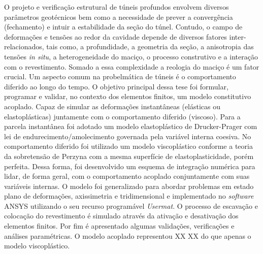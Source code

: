 O projeto e verificação estrutural de túneis profundos envolvem diversos parâmetros geotécnicos bem como a necessidade de prever a convergência (fechamento) e intuir a estabilidade da seção do túnel. Contudo, o campo de deformações e tensões ao redor da cavidade depende de diversos fatores inter-relacionados, tais como, a profundidade, a geometria da seção, a anisotropia das tensões \textit{in situ}, a heterogeneidade do maciço, o processo construtivo e a interação com o revestimento. Somado a essa complexidade a reologia do maciço é um fator crucial. Um aspecto comum na probelmática de túneis é o comportamento diferido ao longo do tempo. O objetivo principal dessa tese foi formular, programar e validar, no contexto dos elementos finitos, um modelo constitutivo acoplado. Capaz de simular as deformações instantâneas (elásticas ou elastoplásticas) juntamente com o comportamento diferido (viscoso). Para a parcela instantânea foi adotado um modelo elastoplástico de Drucker-Prager com lei de endurecimento/amolecimento governada pela variável interna coesiva. No comportamento diferido foi utilizado um modelo viscoplástico conforme a teoria da sobretensão de Perzyna com a mesma superfície de elastoplasticidade, porém perfeita. Dessa forma, foi desenvolvido um esquema de integração numérica para lidar, de forma geral, com o comportamento acoplado conjuntamente com suas variáveis internas. O modelo foi generalizado para abordar problemas em estado plano de deformações, axissimetria e tridimensional e implementado no \textit{software} ANSYS utilizando o seu recurso programável \textit{Usermat}. O processo de escavação e colocação do revestimento é simulado através da ativação e desativação dos elementos finitos. Por fim é apresentado algumas validações, verificações e análises paramétricas. O modelo acoplado representou XX XX do que apenas o modelo viscoplástico. 